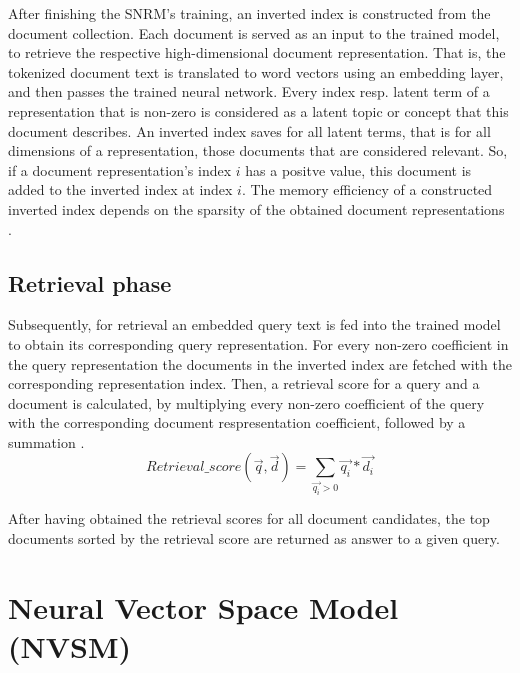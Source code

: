 After finishing the SNRM's training, an inverted index is constructed
    from the document collection.
Each document is served as an input to the trained model, to retrieve
    the respective high-dimensional document representation.
That is, the tokenized document text is translated to word vectors
    using an embedding layer, and then passes the trained 
    neural network.
Every index resp. latent term of a representation that is non-zero
    is considered as a latent topic or concept that this document describes.
An inverted index saves for all latent terms, that is for all dimensions
    of a representation, those documents that are considered relevant.
So, if a document representation's index $i$ has a positve value,
    this document is added to the inverted index at index $i$.
The memory efficiency of a constructed inverted index depends on the
    sparsity of the obtained document representations
    \cite{zamani:2018:from-neural-reranking-to-neural-ranking}.

\subsection*{Retrieval phase}

Subsequently, for retrieval an embedded query text is fed into the trained
    model to obtain its corresponding query representation.
For every non-zero coefficient in the query representation the
    documents in the inverted index are fetched with the corresponding
    representation index.
Then, a retrieval score for a query and a document is calculated,
    by multiplying every non-zero coefficient of the query with the corresponding
    document respresentation coefficient, followed by a summation
    \cite{zamani:2018:from-neural-reranking-to-neural-ranking}.
\[
Retrieval\_score(\vec{q}, \vec{d}) = \sum_{\vec{q_i} > 0} \vec{q_i} * \vec{d_i}
\]

After having obtained the retrieval scores for all document candidates,
    the top documents sorted by the retrieval score are returned as 
    answer to a given query.

\section{Neural Vector Space Model (NVSM)}


